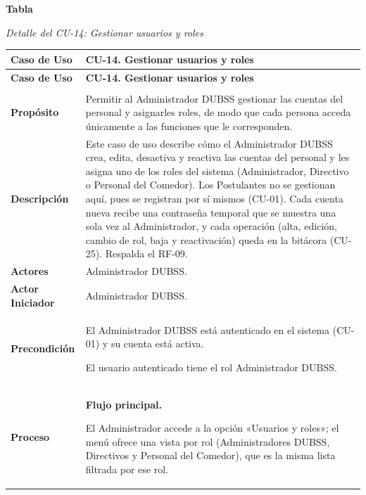 \label{tab:detalle_cu14}
\noindent\textbf{Tabla~\thetable}\par\nopagebreak
\noindent\textit{Detalle del CU-14: Gestionar usuarios y roles}\par\nopagebreak
\begingroup\small\linespread{1}\selectfont
\begin{longtable}{>{\raggedright\arraybackslash}p{2.9cm} >{\raggedright\arraybackslash}p{12.6cm}}
\toprule
\textbf{Caso de Uso} & \textbf{CU-14. Gestionar usuarios y roles} \\
\midrule
\endfirsthead
\toprule
\textbf{Caso de Uso} & \textbf{CU-14. Gestionar usuarios y roles} \\
\midrule
\endhead
\endfoot
\bottomrule
\multicolumn{2}{l}{\textit{Nota.} Elaboración propia.} \\
\endlastfoot
\textbf{Propósito} & Permitir al Administrador DUBSS gestionar las cuentas del personal y asignarles roles, de modo que cada persona acceda únicamente a las funciones que le corresponden. \\
\midrule
\textbf{Descripción} & Este caso de uso describe cómo el Administrador DUBSS crea, edita, desactiva y reactiva las cuentas del personal y les asigna uno de los roles del sistema (Administrador, Directivo o Personal del Comedor). Los Postulantes no se gestionan aquí, pues se registran por sí mismos (CU-01). Cada cuenta nueva recibe una contraseña temporal que se muestra una sola vez al Administrador, y cada operación (alta, edición, cambio de rol, baja y reactivación) queda en la bitácora (CU-25). Respalda el RF-09. \\
\midrule
\textbf{Actores} & Administrador DUBSS. \\
\midrule
\textbf{Actor Iniciador} & Administrador DUBSS. \\
\midrule
\textbf{Precondición} & \vspace{-\baselineskip}\begin{cuvin}
    \item El Administrador DUBSS está autenticado en el sistema (CU-01) y su cuenta está activa.
    \item El usuario autenticado tiene el rol Administrador DUBSS.
\end{cuvin} \\
\midrule
\textbf{Proceso} & \textbf{Flujo principal.}
\begin{cupasos}
    \item El Administrador accede a la opción «Usuarios y roles»; el menú ofrece una vista por rol (Administradores DUBSS, Directivos y Personal del Comedor), que es la misma lista filtrada por ese rol.

\end{cupasos}
\end{longtable}
